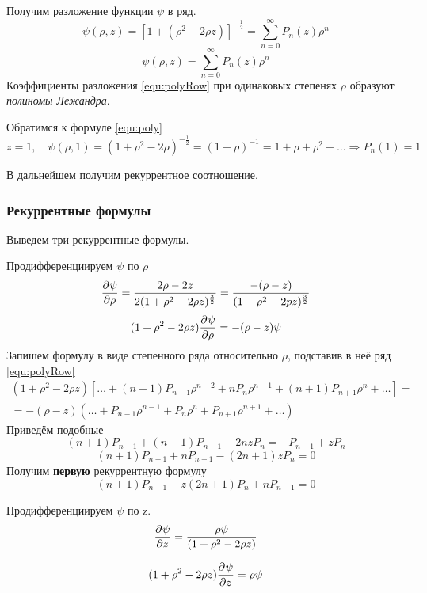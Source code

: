 Получим разложение функции $\psi$ в ряд.
\[
	\psi(\rho, z) = \left[1 + (\rho^2 - 2 \rho z) \right]^{- \frac{1}{2}} = \sum\limits_{n = 0}^{\infty} P_n (z) \rho^n
\]
\begin{equation}
    \psi(\rho, z) = \sum\limits_{n = 0}^{\infty} P_n (z) \rho^n
	\label{equ:polyRow}
\end{equation}
Коэффициенты разложения \eqref{equ:polyRow} при одинаковых степенях $\rho$ образуют \textit{полиномы Лежандра}.

Обратимся к формуле \eqref{equ:poly}
\[z = 1, \quad \psi (\rho, 1 )= (1 + \rho^2 - 2 \rho)^{- \frac{1}{2}} = (1 - \rho)^{-1} = 1 + \rho + \rho^2 + \ldots \Rightarrow P_n(1) = 1\]

В дальнейшем получим рекуррентное соотношение.
\subsubsection{Рекуррентные формулы}
Выведем три рекуррентные формулы.

Продифференциируем $\psi$ по $\rho$
\[
    \frac{\partial^{}\psi}{\partial \rho^{}} = \frac{2 \rho - 2 z}{2 (1 + \rho^2 - 2 \rho z)^{\frac{3}{2}}} = \frac{- (\rho - z)}{(1 + \rho^2 - 2 p z)^{\frac{3}{2}}}
\]
\begin{equation}
	(1 + \rho^2 - 2 \rho z) \frac{\partial^{}\psi}{\partial \rho^{}} = - (\rho - z) \psi
	\label{equ:poly3}
\end{equation}
Запишем формулу в виде степенного ряда относительно $\rho$, подставив в неё ряд \eqref{equ:polyRow}
\begin{multline*}
    (1 + \rho^2 - 2 \rho z) \left[\ldots + (n - 1) P_{n - 1} \rho^{n - 2} + n P_n \rho^{n - 1} + (n + 1) P_{n + 1} \rho^n + \ldots \right] = \\= - (\rho - z) \left(\ldots + P_{n - 1}\rho^{n - 1} + P_n \rho^n + P_{n + 1} \rho^{n + 1}+ \ldots \right)
\end{multline*}
Приведём подобные 
\[(n + 1) P_{n + 1} + (n - 1) P_{n - 1} - 2 n z P_n = - P_{n - 1} + z P_n\]
\[(n + 1) P_{n + 1} + n P_{n - 1} - (2n + 1) z P_n =0\]
Получим \textbf{первую} рекуррентную формулу
\begin{equation}
    (n + 1) P_{n + 1} - z(2n + 1) P_n + n P_{n - 1} = 0
	\label{equ:poly4}
\end{equation}

Продифференциируем $\psi$ по z.
\[
    \frac{\partial^{}\psi}{\partial z^{}} = \frac{\rho \psi}{(1 + \rho^2 - 2 \rho z)}
\]

\begin{equation}
    (1 + \rho^2 - 2 \rho z) \frac{\partial^{}\psi}{\partial z^{}} = \rho \psi
\end{equation}

